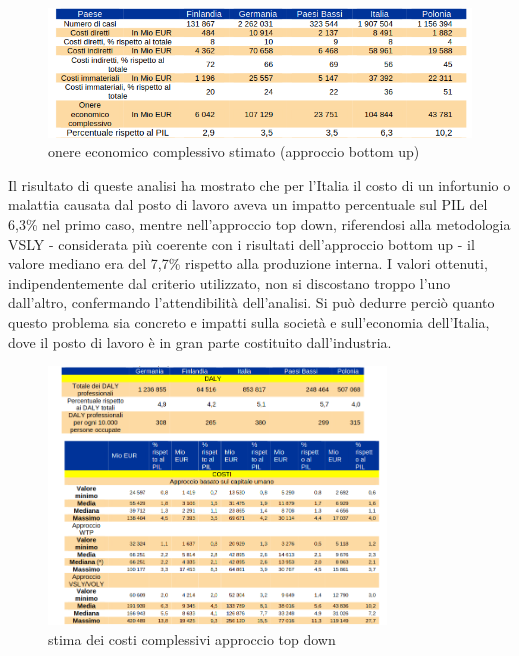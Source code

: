 \vspace{0,5cm}
\begin{figure}[htbp]
    \centering
    \includegraphics[width=\textwidth]{figures/onere_infortuni_ba.png}
    \caption{onere economico complessivo stimato (approccio bottom up)}
    \label{fig:osha_table1}
\end{figure}
\vspace{0,5cm} 

\noindent Il risultato di queste analisi ha mostrato che per l'Italia il costo di un infortunio o malattia causata dal posto di lavoro aveva un impatto percentuale sul PIL del 6,3\% nel primo caso, mentre nell'approccio top down, riferendosi alla metodologia VSLY - considerata più coerente con i risultati dell'approccio bottom up - il valore mediano era del 7,7\% rispetto alla produzione interna. I valori ottenuti, indipendentemente dal criterio utilizzato, non si discostano troppo l'uno dall'altro, confermando l'attendibilità dell'analisi. Si può dedurre perciò quanto questo problema sia concreto e impatti sulla società e sull'economia dell'Italia, dove il posto di lavoro è in gran parte costituito dall'industria. 
 
\renewcommand{\floatpagefraction}{0.7} %
\begin{figure}[htbp]
    \centering
    \includegraphics[width=0.8\textwidth]{figures/onere_infortuni_td.png}
    \caption{stima dei costi complessivi approccio top down}
    \label{fig:osha_table2}
\end{figure} 

